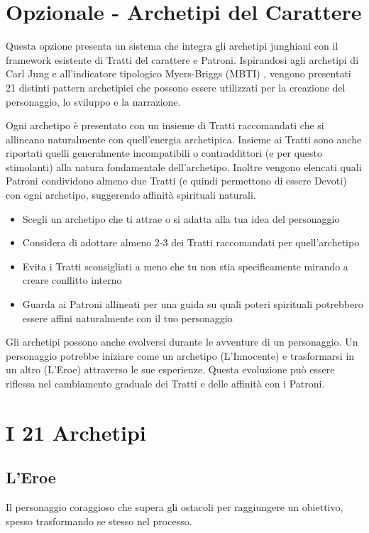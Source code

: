 \section{Opzionale - Archetipi del Carattere}

\begin{multicols}{2}

Questa opzione presenta un sistema che integra gli archetipi junghiani \autocite{jung1971} con il framework esistente di Tratti del carattere e Patroni. Ispirandosi agli archetipi di Carl Jung e all'indicatore tipologico Myers-Briggs (MBTI) \autocite{myers1995}, vengono presentati 21 distinti pattern archetipici che possono essere utilizzati per la creazione del personaggio, lo sviluppo e la narrazione.

Ogni archetipo è presentato con un insieme di Tratti raccomandati che si allineano naturalmente con quell'energia archetipica. Insieme ai Tratti sono anche riportati quelli  generalmente incompatibili o contraddittori (e per questo stimolanti) alla natura fondamentale dell'archetipo. Inoltre vengono elencati quali Patroni condividono almeno due Tratti (e quindi permettono di essere Devoti) con ogni archetipo, suggerendo affinità spirituali naturali.

\begin{itemize}
\item Scegli un archetipo che ti attrae o si adatta alla tua idea del personaggio
\item Considera di adottare almeno 2-3 dei Tratti raccomandati per quell'archetipo
\item Evita i Tratti sconsigliati a meno che tu non stia specificamente mirando a creare conflitto interno
\item Guarda ai Patroni allineati per una guida su quali poteri spirituali potrebbero essere affini naturalmente con il tuo personaggio
\end{itemize}

Gli archetipi possono anche evolversi durante le avventure di un personaggio. Un personaggio potrebbe iniziare come un archetipo (L'Innocente) e trasformarsi in un altro (L'Eroe) attraverso le sue esperienze. Questa evoluzione può essere riflessa nel cambiamento graduale dei Tratti e delle affinità con i Patroni.

\section*{I 21 Archetipi}

\subsection*{L'Eroe}
Il personaggio coraggioso che supera gli ostacoli per raggiungere un obiettivo, spesso trasformando se stesso nel processo.


\end{multicols}
